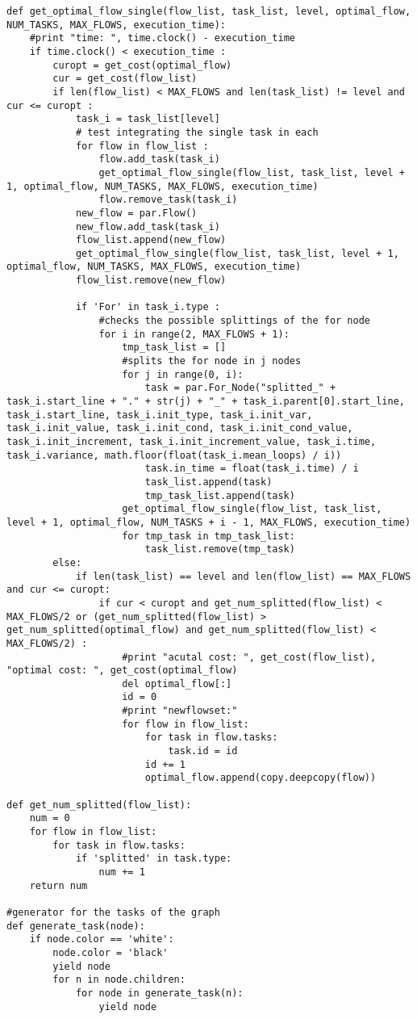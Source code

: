 \documentclass[a4paper,10pt,twoside]{book}
\begin{document}
\begin{lstlisting}[language=CCC, caption=graphCreator.py]
def get_optimal_flow_single(flow_list, task_list, level, optimal_flow, NUM_TASKS, MAX_FLOWS, execution_time):
	#print "time: ", time.clock() - execution_time
	if time.clock() < execution_time :
		curopt = get_cost(optimal_flow)
		cur = get_cost(flow_list)
		if len(flow_list) < MAX_FLOWS and len(task_list) != level and cur <= curopt :
			task_i = task_list[level]
			# test integrating the single task in each
			for flow in flow_list :
				flow.add_task(task_i)
				get_optimal_flow_single(flow_list, task_list, level + 1, optimal_flow, NUM_TASKS, MAX_FLOWS, execution_time)
				flow.remove_task(task_i)
			new_flow = par.Flow()		
			new_flow.add_task(task_i)
			flow_list.append(new_flow)
			get_optimal_flow_single(flow_list, task_list, level + 1, optimal_flow, NUM_TASKS, MAX_FLOWS, execution_time)
			flow_list.remove(new_flow)

			if 'For' in task_i.type :
				#checks the possible splittings of the for node
				for i in range(2, MAX_FLOWS + 1):
					tmp_task_list = []
					#splits the for node in j nodes
					for j in range(0, i):
						task = par.For_Node("splitted_" + task_i.start_line + "." + str(j) + "_" + task_i.parent[0].start_line, task_i.start_line, task_i.init_type, task_i.init_var, task_i.init_value, task_i.init_cond, task_i.init_cond_value, task_i.init_increment, task_i.init_increment_value, task_i.time, task_i.variance, math.floor(float(task_i.mean_loops) / i))
						task.in_time = float(task_i.time) / i
						task_list.append(task)
						tmp_task_list.append(task)
					get_optimal_flow_single(flow_list, task_list, level + 1, optimal_flow, NUM_TASKS + i - 1, MAX_FLOWS, execution_time)
					for tmp_task in tmp_task_list:
						task_list.remove(tmp_task)		
		else:
			if len(task_list) == level and len(flow_list) == MAX_FLOWS and cur <= curopt:
				if cur < curopt and get_num_splitted(flow_list) <  MAX_FLOWS/2 or (get_num_splitted(flow_list) > get_num_splitted(optimal_flow) and get_num_splitted(flow_list) <  MAX_FLOWS/2) :
					#print "acutal cost: ", get_cost(flow_list), "optimal cost: ", get_cost(optimal_flow)
					del optimal_flow[:]
					id = 0
					#print "newflowset:"
					for flow in flow_list:
						for task in flow.tasks:
							task.id = id
						id += 1
						optimal_flow.append(copy.deepcopy(flow))

def get_num_splitted(flow_list):
	num = 0
	for flow in flow_list:
		for task in flow.tasks:
			if 'splitted' in task.type:
				num += 1
	return num

#generator for the tasks of the graph
def generate_task(node):
	if node.color == 'white':
		node.color = 'black'
		yield node
		for n in node.children:
			for node in generate_task(n):
				yield node


\end{lstlisting}
\end{document}
